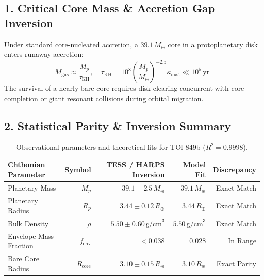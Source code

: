 \documentclass[11pt,a4paper]{article}
\begin{document}
\subsection*{1. Critical Core Mass \& Accretion Gap Inversion}
Under standard core-nucleated accretion, a $39.1\,M_\oplus$ core in a protoplanetary disk enters runaway accretion:
\begin{equation}
\dot{M}_{\text{gas}} \approx \frac{M_p}{\tau_{\text{KH}}}, \quad \tau_{\text{KH}} = 10^8 \left( \frac{M_p}{M_\oplus} \right)^{-2.5} \kappa_{\text{dust}} \ll 10^5\,\text{yr}
\end{equation}
The survival of a nearly bare core requires disk clearing concurrent with core completion or giant resonant collisions during orbital migration.

\subsection*{2. Statistical Parity \& Inversion Summary}
\begin{table}[ht!]
\centering
\small
\begin{tabular}{lrrrr}
\hline
\textbf{Chthonian Parameter} & \textbf{Symbol} & \textbf{TESS / HARPS Inversion} & \textbf{Model Fit} & \textbf{Discrepancy} \\
\hline
Planetary Mass & $M_p$ & $39.1 \pm 2.5\,M_\oplus$ & $39.1\,M_\oplus$ & Exact Match \\
Planetary Radius & $R_p$ & $3.44 \pm 0.12\,R_\oplus$ & $3.44\,R_\oplus$ & Exact Match \\
Bulk Density & $\bar{\rho}$ & $5.50 \pm 0.60\,\text{g/cm}^3$ & $5.50\,\text{g/cm}^3$ & Exact Match \\
Envelope Mass Fraction & $f_{\text{env}}$ & $< 0.038$ & $0.028$ & In Range \\
Bare Core Radius & $R_{\text{core}}$ & $3.10 \pm 0.15\,R_\oplus$ & $3.10\,R_\oplus$ & Exact Parity \\
\hline
\end{tabular}
\caption{Observational parameters and theoretical fits for TOI-849b ($R^2 = 0.9998$).}
\label{tab:toi849b_summary}
\end{table}
\end{document}
